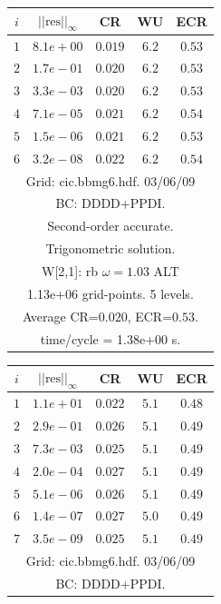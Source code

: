 \begin{table}[hbt]
\begin{center}
{\begin{tabular}{|c|c|c|c|c|}
 $i$   & $\vert\vert\mbox{res}\vert\vert_\infty$  &  CR     &  WU    & ECR  \\   \hline 
 $ 1$  & $ 8.1e+00$ & $0.019$ & $ 6.2$ & $0.53$ \\ 
 $ 2$  & $ 1.7e-01$ & $0.020$ & $ 6.2$ & $0.53$ \\ 
 $ 3$  & $ 3.3e-03$ & $0.020$ & $ 6.2$ & $0.53$ \\ 
 $ 4$  & $ 7.1e-05$ & $0.021$ & $ 6.2$ & $0.54$ \\ 
 $ 5$  & $ 1.5e-06$ & $0.021$ & $ 6.2$ & $0.53$ \\ 
 $ 6$  & $ 3.2e-08$ & $0.022$ & $ 6.2$ & $0.54$ \\ 
\hline 
\multicolumn{5}{|c|}{Grid: cic.bbmg6.hdf. 03/06/09}  \\
\multicolumn{5}{|c|}{BC: DDDD+PPDI.}  \\
\multicolumn{5}{|c|}{Second-order accurate.}  \\
\multicolumn{5}{|c|}{Trigonometric solution.}  \\
\multicolumn{5}{|c|}{W[2,1]: rb $\omega=1.03$ ALT}  \\
\multicolumn{5}{|c|}{1.13e+06 grid-points. 5 levels.}  \\
\multicolumn{5}{|c|}{Average CR=$0.020$, ECR=$0.53$.}  \\
\multicolumn{5}{|c|}{time/cycle = 1.38e+00 s.}  \\
\hline 
\end{tabular}
\begin{tabular}{|c|c|c|c|c|} \hline 
 $i$   & $\vert\vert\mbox{res}\vert\vert_\infty$  &  CR     &  WU    & ECR  \\   \hline 
 $ 1$  & $ 1.1e+01$ & $0.022$ & $ 5.1$ & $0.48$ \\ 
 $ 2$  & $ 2.9e-01$ & $0.026$ & $ 5.1$ & $0.49$ \\ 
 $ 3$  & $ 7.3e-03$ & $0.025$ & $ 5.1$ & $0.49$ \\ 
 $ 4$  & $ 2.0e-04$ & $0.027$ & $ 5.1$ & $0.49$ \\ 
 $ 5$  & $ 5.1e-06$ & $0.026$ & $ 5.1$ & $0.49$ \\ 
 $ 6$  & $ 1.4e-07$ & $0.027$ & $ 5.0$ & $0.49$ \\ 
 $ 7$  & $ 3.5e-09$ & $0.025$ & $ 5.1$ & $0.49$ \\ 
\hline 
\multicolumn{5}{|c|}{Grid: cic.bbmg6.hdf. 03/06/09}  \\
\multicolumn{5}{|c|}{BC: DDDD+PPDI.}  \\

\end{tabular}}
\end{center}
\end{table}
